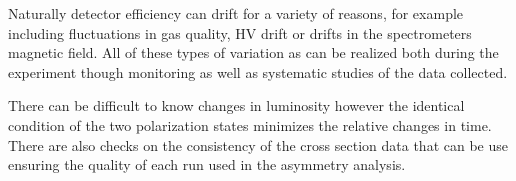 Naturally detector efficiency can drift for a variety of reasons, for
example including fluctuations in gas quality, HV drift or
drifts in the spectrometers magnetic field.  All of these types of variation as can be realized both
during the experiment though monitoring as well as systematic studies of the data collected.

There can be difficult to know changes in luminosity however the identical condition of the two
polarization states minimizes the relative changes in time.  There are also checks on the consistency
of the cross section data that can be use ensuring the quality of each run used in the asymmetry analysis.






















%
%


